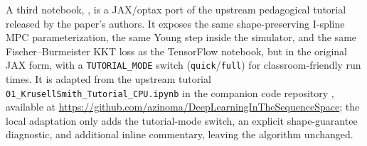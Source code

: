 \documentclass[11pt,a4paper]{report}
\begin{document}
\medskip
A third notebook, , is a JAX/optax port of the upstream pedagogical tutorial released by the paper's authors.  It exposes the same shape-preserving I-spline MPC parameterization, the same Young step inside the simulator, and the same Fischer--Burmeister KKT loss as the TensorFlow notebook, but in the original JAX form, with a \texttt{TUTORIAL\_MODE} switch (\texttt{quick}/\texttt{full}) for classroom-friendly run times.  It is adapted from the upstream tutorial \texttt{01\_KrusellSmith\_Tutorial\_CPU.ipynb} in the companion code repository \citep{azinovicyangzemlicka2025sequencespacecode}, available at \url{https://github.com/azinoma/DeepLearningInTheSequenceSpace}; the local adaptation only adds the tutorial-mode switch, an explicit shape-guarantee diagnostic, and additional inline commentary, leaving the algorithm unchanged.
\end{document}
